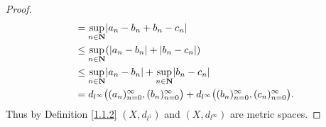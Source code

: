 \begin{proof}
\begin{align*}
                                                                         & = \sup_{n \in \mathbf{N}} \abs*{a_n - b_n + b_n - c_n}                                                                                 \\
                                                                         & \leq \sup_{n \in \mathbf{N}} (\abs*{a_n - b_n} + \abs*{b_n - c_n})                                                                     \\
                                                                         & \leq \sup_{n \in \mathbf{N}} \abs*{a_n - b_n} + \sup_{n \in \mathbf{N}} \abs*{b_n - c_n}                                               \\
                                                                         & = d_{l^\infty}\big((a_n)_{n = 0}^\infty, (b_n)_{n = 0}^\infty\big) + d_{l^\infty}\big((b_n)_{n = 0}^\infty, (c_n)_{n = 0}^\infty\big).
    \end{align*}
    Thus by Definition \ref{1.1.2} \((X, d_{l^1})\) and \((X, d_{l^\infty})\) are metric spaces.


\end{proof}

